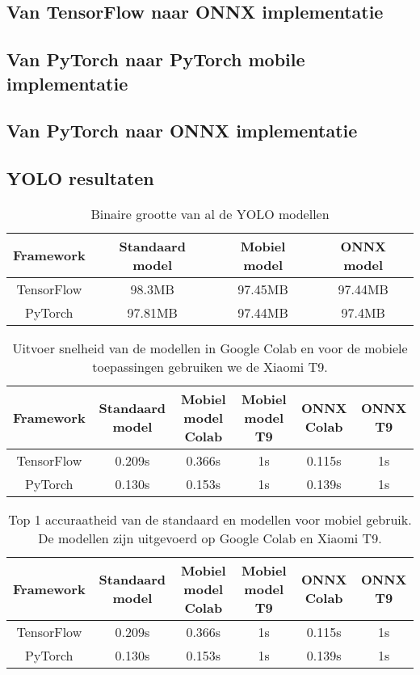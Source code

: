 \subsection{Van TensorFlow naar ONNX implementatie}


\subsection{Van PyTorch naar PyTorch mobile implementatie}

\subsection{Van PyTorch naar ONNX implementatie}

\subsection{YOLO resultaten}

\begin{table}[!ht]
    \caption{Binaire grootte van al de YOLO modellen}
\begin{tabular}{cccc}
    \hline
    Framework & Standaard model & Mobiel model & ONNX model \\
    \hline
    TensorFlow & 98.3MB & 97.45MB & 97.44MB \\
    PyTorch & 97.81MB & 97.44MB & 97.4MB \\
    \hline
\end{tabular}
\label{tab:yolo_size}
\end{table}

\begin{table}[!ht]
    \caption{Uitvoer snelheid van de modellen in Google Colab en voor de mobiele toepassingen gebruiken we de Xiaomi T9.}
\begin{tabular}{cccccc}
    \hline
    Framework & Standaard model & Mobiel model Colab & Mobiel model T9 & ONNX Colab & ONNX T9\\
    \hline
    TensorFlow & 0.209s & 0.366s & 1s & 0.115s & 1s \\
    PyTorch & 0.130s & 0.153s & 1s & 0.139s & 1s \\
    \hline
\end{tabular}
\label{tab:yolo_speed}
\end{table}

\begin{table}[!ht]
    \caption{Top 1 accuraatheid van de standaard en modellen voor mobiel gebruik. De modellen zijn uitgevoerd op Google Colab en Xiaomi T9.}
\begin{tabular}{cccccc}
    \hline
    Framework & Standaard model & Mobiel model Colab & Mobiel model T9 & ONNX Colab & ONNX T9\\
    \hline
    TensorFlow & 0.209s & 0.366s & 1s & 0.115s & 1s \\
    PyTorch & 0.130s & 0.153s & 1s & 0.139s & 1s \\
    \hline
\end{tabular}
\label{tab:yolo_acc}
\end{table}